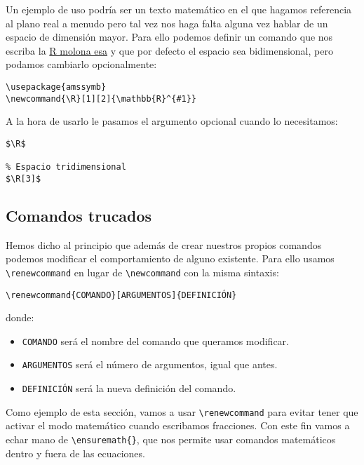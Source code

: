Un ejemplo de uso podría ser un texto matemático en el que hagamos
referencia al plano real a menudo pero tal vez nos haga falta alguna vez
hablar de un espacio de dimensión mayor. Para ello podemos definir un
comando que nos escriba la
\href{https://en.wikipedia.org/wiki/Real_number\#/media/File:Latex_real_numbers.svg}{R
molona esa} y que por defecto el espacio sea bidimensional, pero podamos
cambiarlo opcionalmente:

\begin{lstlisting}[language={[latex]tex}]
\usepackage{amssymb}
\newcommand{\R}[1][2]{\mathbb{R}^{#1}}
\end{lstlisting}

A la hora de usarlo le pasamos el argumento opcional cuando lo
necesitamos:

\begin{lstlisting}[language={[latex]tex}]
% Espacio bidimensional
$\R$

% Espacio tridimensional
$\R[3]$
\end{lstlisting}

\subsection{Comandos trucados}

Hemos dicho al principio que además de crear nuestros propios comandos
podemos modificar el comportamiento de alguno existente. Para ello
usamos \lstinline!\renewcommand! en lugar de \lstinline!\newcommand! con
la misma sintaxis:

\begin{lstlisting}[language={[latex]tex}]
\renewcommand{COMANDO}[ARGUMENTOS]{DEFINICIÓN}
\end{lstlisting}

donde:

\begin{itemize}
\item
  \lstinline!COMANDO! será el nombre del comando que queramos modificar.
\item
  \lstinline!ARGUMENTOS! será el número de argumentos, igual que antes.
\item
  \lstinline!DEFINICIÓN! será la nueva definición del comando.
\end{itemize}

Como ejemplo de esta sección, vamos a usar \lstinline!\renewcommand!
para evitar tener que activar el modo matemático cuando escribamos
fracciones. Con este fin vamos a echar mano de
\lstinline!\ensuremath{}!,
que nos permite usar comandos matemáticos dentro y fuera de las
ecuaciones.

